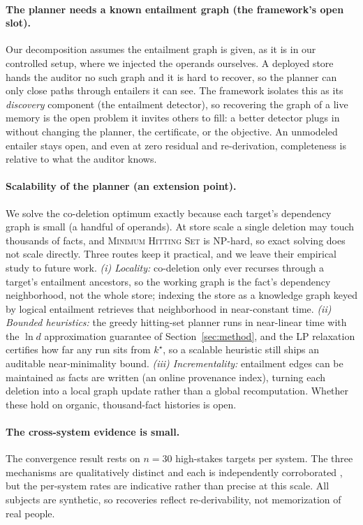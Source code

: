 \documentclass[letterpaper]{article}
\begin{document}
\paragraph{The planner needs a known entailment graph (the framework's open slot).} Our
decomposition assumes the entailment graph is given, as it is in our controlled setup, where
we injected the operands ourselves. A deployed store hands the auditor no such graph and it
is hard to recover, so the planner can only close paths through entailers it can see. The
framework isolates this as its \emph{discovery} component (the entailment detector), so
recovering the graph of a live memory is the open problem it invites others to fill: a
better detector plugs in without changing the planner, the certificate, or the objective.
An unmodeled entailer stays open, and even at zero residual and re-derivation, completeness
is relative to what the auditor knows.

\paragraph{Scalability of the planner (an extension point).} We solve the co-deletion
optimum exactly because each target's dependency graph is small (a handful of operands). At store scale
a single deletion may touch thousands of facts, and \textsc{Minimum Hitting Set} is
NP-hard, so exact solving does not scale directly. Three routes keep it practical, and
we leave their empirical study to future work. \emph{(i) Locality:} co-deletion only
ever recurses through a target's entailment ancestors, so the working graph is the
fact's dependency neighborhood, not the whole store; indexing the store as a knowledge
graph keyed by logical entailment \citep{memlineage} retrieves that neighborhood in
near-constant time. \emph{(ii) Bounded heuristics:} the greedy hitting-set planner runs
in near-linear time with the $\ln d$ approximation guarantee of
Section~\ref{sec:method}, and the LP relaxation certifies how far any run sits from
$k^\star$, so a scalable heuristic still ships an auditable near-minimality bound.
\emph{(iii) Incrementality:} entailment edges can be maintained as facts are written (an
online provenance index), turning each deletion into a local graph update rather than a
global recomputation. Whether these hold on organic, thousand-fact histories is open.

\paragraph{The cross-system evidence is small.} The convergence result rests on $n{=}30$
high-stakes targets per system. The three mechanisms are qualitatively distinct and each
is independently corroborated \citep{forgeteval}, but the per-system rates are
indicative rather than precise at this scale. All subjects are synthetic, so recoveries
reflect re-derivability, not memorization of real people.
\end{document}
